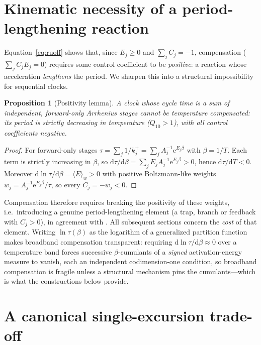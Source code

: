 \documentclass[11pt,onecolumn]{article}
\newtheorem{proposition}{Proposition}
\theoremstyle{definition}
\newcommand{\dd}{\mathrm{d}}
\newcommand{\ee}{\mathrm{e}}
\begin{document}
\section{Kinematic necessity of a period-lengthening reaction}
\label{sec:positivity}

Equation~\eqref{eq:ruoff} shows that, since $E_j\ge 0$ and $\sum_j C_j=-1$, compensation ($\sum_j C_j E_j=0$) requires some control coefficient to be \emph{positive}: a reaction whose acceleration \emph{lengthens} the period. We sharpen this into a structural impossibility for sequential clocks.

\begin{proposition}[Positivity lemma]
\label{prop:positivity}
A clock whose cycle time is a sum of independent, forward-only Arrhenius stages cannot be temperature compensated: its period is strictly decreasing in temperature ($Q_{10}>1$), with all control coefficients negative.
\end{proposition}

\begin{proof}
For forward-only stages $\tau=\sum_j 1/k_j^+=\sum_j A_j^{-1}\ee^{E_j\beta}$ with $\beta=1/T$. Each term is strictly increasing in $\beta$, so $\dd\tau/\dd\beta=\sum_j E_j A_j^{-1}\ee^{E_j\beta}>0$, hence $\dd\tau/\dd T<0$. Moreover $\dd\ln\tau/\dd\beta = \langle E\rangle_w>0$ with positive Boltzmann-like weights $w_j=A_j^{-1}\ee^{E_j\beta}/\tau$, so every $C_j=-w_j<0$.
\end{proof}

Compensation therefore requires breaking the positivity of these weights, i.e.\ introducing a genuine period-lengthening element (a trap, branch or feedback with $C_j>0$), in agreement with \cite{Fu2024}. All subsequent sections concern the \emph{cost} of that element. Writing $\ln\tau(\beta)$ as the logarithm of a generalized partition function makes broadband compensation transparent: requiring $\dd\ln\tau/\dd\beta\approx 0$ over a temperature band forces successive $\beta$-cumulants of a \emph{signed} activation-energy measure to vanish, each an independent codimension-one condition, so broadband compensation is fragile unless a structural mechanism pins the cumulants---which is what the constructions below provide.

\section{A canonical single-excursion trade-off}
\label{sec:twoloop}
\end{document}
